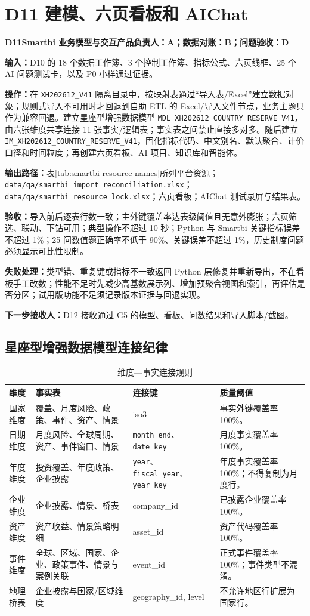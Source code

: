 \documentclass[UTF8,fontset=windows,12pt,openany]{ctexbook}
\newcommand{\Field}[1]{{\small\nolinkurl{#1}}}
\newcommand{\File}[1]{{\small\begingroup\urlstyle{same}\nolinkurl{#1}\endgroup}}
\newcommand{\StepTitle}[3]{%
  \noindent\colorbox{DeepNavy}{\parbox{0.965\textwidth}{\color{white}\Large\bfseries #1\quad #2\hfill\normalsize #3}}\par\medskip
}
\newcommand{\CardRow}[2]{\noindent\textbf{#1：}#2\par}
\begin{document}
\section{D11 建模、六页看板和 AIChat}
\StepTitle{D11}{Smartbi 业务模型与交互产品}{负责人：A；数据对账：B；问题验收：D}
\CardRow{输入}{D10 的 18 个数据工作簿、3 个控制工作簿、指标公式、六页线框、25 个 AI 问题测试卡，以及 P0 小样通过证据。}
\CardRow{操作}{在 \Field{XH202612_V41} 隔离目录中，按映射表通过“导入表/Excel”建立数据对象；规则式导入不可用时才回退到自助 ETL 的 Excel/导入文件节点，业务主题只作为兼容回退。建立星座型增强数据模型 \Field{MDL_XH202612_COUNTRY_RESERVE_V41}，由六张维度共享连接 11 张事实/逻辑表；事实表之间禁止直接多对多。随后建立 \Field{IM_XH202612_COUNTRY_RESERVE_V41}，固化指标代码、中文别名、默认聚合、计价口径和时间粒度；再创建六页看板、AI 项目、知识库和智能体。}
\CardRow{输出路径}{表\ref{tab:smartbi-resource-names}所列平台资源；\File{data/qa/smartbi_import_reconciliation.xlsx}；\File{data/qa/smartbi_resource_lock.xlsx}；六页看板；AIChat 测试录屏与结果表。}
\CardRow{验收}{导入前后逐表行数一致；主外键覆盖率达表级阈值且无意外膨胀；六页筛选、联动、下钻可用；典型操作不超过 10 秒；Python 与 Smartbi 关键指标误差不超过 1\%；25 问数值题正确率不低于 90\%、关键误差不超过 1\%，历史制度问题必须显示可比性限制。}
\CardRow{失败处理}{类型错、重复键或指标不一致返回 Python 层修复并重新导出，不在看板手工改数；性能不足时先减少高基数展示列、增加预聚合视图和索引，再评估是否分区；试用版功能不足须记录版本证据与回退实现。}
\CardRow{下一步接收人}{D12 接收通过 G5 的模型、看板、问数结果和导入脚本/截图。}

\subsection{星座型增强数据模型连接纪律}

\begin{longtable}{p{3.8cm}p{3.2cm}p{3.3cm}p{3.1cm}}
\caption{维度—事实连接规则}\label{tab:model-joins}\\
\toprule
\textbf{维度} & \textbf{事实表} & \textbf{连接键} & \textbf{质量阈值}\\
\midrule
国家维度 & 覆盖、月度风险、政策、事件、资产、情景 & iso3 & 事实外键覆盖率 100\%。\\
日期维度 & 月度风险、全球周期、资产、事件窗口、情景 & \Field{month_end}、\Field{date_key} & 月度事实覆盖率 100\%。\\
年度维度 & 投资覆盖、年度政策、企业披露 & \Field{year}、\Field{fiscal_year}、\Field{year_key} & 年度事实覆盖率 100\%；不得复制为月度行。\\
企业维度 & 企业披露、情景、桥表 & company\_id & 已披露企业覆盖率 100\%。\\
资产维度 & 资产收益、情景策略明细 & asset\_id & 资产代码覆盖率 100\%。\\
事件维度 & 全球、区域、国家、企业、政策事件、情景与案例关联 & event\_id & 正式事件覆盖率 100\%；事件类型不混淆。\\
地理桥表 & 企业披露与国家/区域维度 & geography\_id, level & 不允许地区行扩展为国家行。\\
\bottomrule
\end{longtable}
\end{document}
